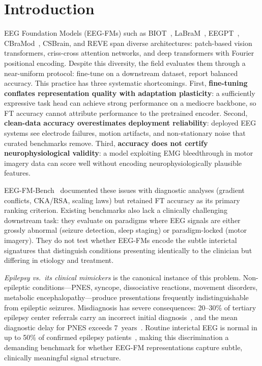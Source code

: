 \documentclass{article}
\begin{document}
\section{Introduction}
\label{sec:intro}

EEG Foundation Models (EEG-FMs) such as BIOT~\citep{yang2023biot}, LaBraM~\citep{jiang2024labram}, EEGPT~\citep{wang2024eegpt}, CBraMod~\citep{wang2024cbramod}, CSBrain, and REVE span diverse architectures: patch-based vision transformers, criss-cross attention networks, and deep transformers with Fourier positional encoding. Despite this diversity, the field evaluates them through a near-uniform protocol: fine-tune on a downstream dataset, report balanced accuracy. This practice has three systematic shortcomings. First, \textbf{fine-tuning conflates representation quality with adaptation plasticity}: a sufficiently expressive task head can achieve strong performance on a mediocre backbone, so FT accuracy cannot attribute performance to the pretrained encoder. Second, \textbf{clean-data accuracy overestimates deployment reliability}: deployed EEG systems see electrode failures, motion artifacts, and non-stationary noise that curated benchmarks remove. Third, \textbf{accuracy does not certify neurophysiological validity}: a model exploiting EMG bleedthrough in motor imagery data can score well without encoding neurophysiologically plausible features.

EEG-FM-Bench~\citep{xiong2026eegfmbench} documented these issues with diagnostic analyses (gradient conflicts, CKA/RSA, scaling laws) but retained FT accuracy as its primary ranking criterion. Existing benchmarks also lack a clinically challenging downstream task: they evaluate on paradigms where EEG signals are either grossly abnormal (seizure detection, sleep staging) or paradigm-locked (motor imagery). They do not test whether EEG-FMs encode the subtle interictal signatures that distinguish conditions presenting identically to the clinician but differing in etiology and treatment.

\emph{Epilepsy vs.\ its clinical mimickers} is the canonical instance of this problem. Non-epileptic conditions---PNES, syncope, dissociative reactions, movement disorders, metabolic encephalopathy---produce presentations frequently indistinguishable from epileptic seizures. Misdiagnosis has severe consequences: 20--30\% of tertiary epilepsy center referrals carry an incorrect initial diagnosis~\citep{benbadis2000errors}, and the mean diagnostic delay for PNES exceeds 7~years~\citep{reuber2002diagnostic}. Routine interictal EEG is normal in up to 50\% of confirmed epilepsy patients~\citep{smith2005eeg}, making this discrimination a demanding benchmark for whether EEG-FM representations capture subtle, clinically meaningful signal structure.
\end{document}
